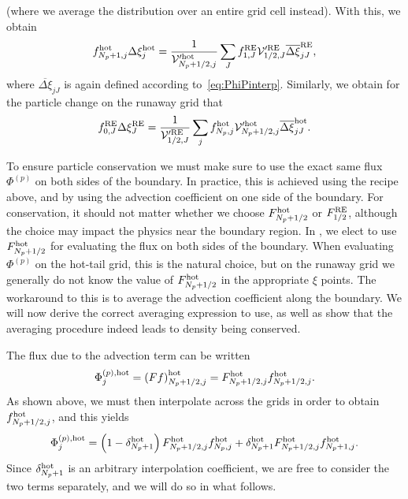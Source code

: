 \documentclass{notes}
\newcommand{\Vp}{\mathcal{V}'}
\begin{document}
    (where we average the distribution over an entire grid cell instead).
    With this, we obtain
    \begin{equation}\label{eq:fhotTransf}
        f^{\rm hot}_{N_p+1,j}\Delta\xi_j^{\rm hot} =
            \frac{1}{\Vp^{\rm hot}_{N_p+1/2,j}} \sum_J
                f_{1,J}^{\rm RE} \Vp^{\rm RE}_{1/2,J} \overline{\Delta\xi}_{jJ}^{\rm RE},
    \end{equation}
    where $\overline{\Delta\xi}_{jJ}$ is again defined according
    to~\eqref{eq:PhiPinterp}. Similarly, we obtain for the particle change on
    the runaway grid that
    \begin{equation}\label{eq:crossFlux_fRE0}
        f^{\rm RE}_{0,J}\Delta\xi_J^{\rm RE} =
            \frac{1}{\Vp^{\rm RE}_{1/2,J}} \sum_j
                f_{N_p,j}^{\rm hot} \Vp^{\rm hot}_{N_p+1/2,j} \overline{\Delta\xi}_{jJ}^{\rm hot}.
    \end{equation}

    To ensure particle conservation we must make sure to use the exact same flux
    $\Phi^{(p)}$ on both sides of the boundary. In practice, this is achieved
    using the recipe above, and by using the advection coefficient on one side
    of the boundary. For conservation, it should not matter whether we choose
    $F_{N_p+1/2}^{\rm hot}$ or $F_{1/2}^{\rm RE}$, although the choice may
    impact the physics near the boundary region. In \DREAM, we elect to use
    $F_{N_p+1/2}^{\rm hot}$ for evaluating the flux on both sides of the
    boundary. When evaluating $\Phi^{(p)}$ on the hot-tail grid, this is the
    natural choice, but on the runaway grid we generally do not know the value
    of $F^{\rm hot}_{N_p+1/2}$ in the appropriate $\xi$ points. The workaround
    to this is to average the advection coefficient along the boundary. We will
    now derive the correct averaging expression to use, as well as show that
    the averaging procedure indeed leads to density being conserved.

    The flux due to the advection term can be written
    \begin{equation}
        \Phi_j^{(p),{\rm hot}} = \left( Ff \right)^{\rm hot}_{N_p+1/2,j} = F_{N_p+1/2,j}^{\rm hot} f^{\rm hot}_{N_p+1/2,j}.
    \end{equation}
    As shown above, we must then interpolate across the grids in order to obtain
    $f^{\rm hot}_{N_p+1/2,j}$, and this yields
    \begin{equation}\label{eq:PhiPhot}
        \Phi^{(p),{\rm hot}}_j =
            \left(1-\delta^{\rm hot}_{N_p+1}\right) F^{\rm hot}_{N_p+1/2,j} f_{N_p,j}^{\rm hot} +
            \delta^{\rm hot}_{N_p+1} F^{\rm hot}_{N_p+1/2,j} f_{N_p+1,j}^{\rm hot}.
    \end{equation}
    Since $\delta^{\rm hot}_{N_p+1}$ is an arbitrary interpolation coefficient,
    we are free to consider the two terms separately, and we will do so in what
    follows.
\end{document}

